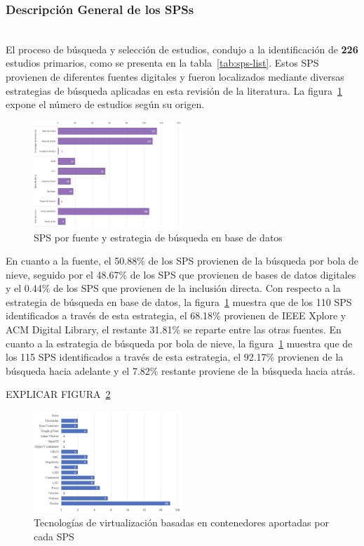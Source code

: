 \subsubsection{Descripción General de los SPSs}
\mbox{}\\
El proceso de búsqueda y selección de estudios, condujo a la identificación de \textbf{226} estudios primarios, como se presenta en la tabla~\ref{tab:sps-list}.
Estos SPS provienen de diferentes fuentes digitales y fueron localizados mediante diversas estrategias de búsqueda aplicadas en esta revisión de la literatura. La figura~\ref{fig:SPS-SOURCE-SE} expone el número de estudios según su origen.
\begin{figure}[htbp]
    \centering
    \includegraphics[width=0.5\textwidth]{resources/images/resultados/SPS-SOURCE-SE.png}
    \caption{SPS por fuente y estrategia de búsqueda en base de datos}\label{fig:SPS-SOURCE-SE}
\end{figure}
En cuanto a la fuente, el 50.88\% de los SPS provienen de la búsqueda por bola de nieve, seguido por el 48.67\% de los SPS que provienen de bases de datos digitales y el 0.44\% de los SPS que provienen de la inclusión directa.
Con respecto a la estrategia de búsqueda en base de datos, la figura~\ref{fig:SPS-SOURCE-SE} muestra que de los 110 SPS identificados a través de esta estrategia, el 68.18\% provienen de IEEE Xplore y ACM Digital Library, el restante 31.81\% se reparte entre las otras fuentes.
En cuanto a la estrategia de búsqueda por bola de nieve, la figura~\ref{fig:SPS-SOURCE-SE} muestra que de los 115 SPS identificados a través de esta estrategia, el 92.17\% provienen de la búsqueda hacia adelante y el 7.82\% restante proviene de la búsqueda hacia atrás.


EXPLICAR FIGURA~\ref{fig:SPS-VBC}
\begin{figure}[htbp]
    \centering
    \includegraphics[width=0.5\textwidth]{resources/images/resultados/SPS-VBC.png}
    \caption{Tecnologías de virtualización basadas en contenedores aportadas por cada SPS}\label{fig:SPS-VBC}
\end{figure} 


